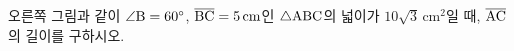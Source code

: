\noindent\begin{minipage}[t]{0.58\linewidth}\vspace{0pt}\raggedright 오른쪽 그림과 같이 $\angle\mathrm{B}=60^\circ$, $\overline{\mathrm{BC}}=5\,\mathrm{cm}$인 $\triangle\mathrm{ABC}$의 넓이가 $10\sqrt{3}\,\mathrm{cm}^2$일 때, $\overline{\mathrm{AC}}$의 길이를 구하시오.\end{minipage}\hfill\begin{minipage}[t]{0.4\linewidth}\vspace{0pt}\centering \resizebox{\ifdim\width>\linewidth\linewidth\else\width\fi}{!}{}\end{minipage}\par
